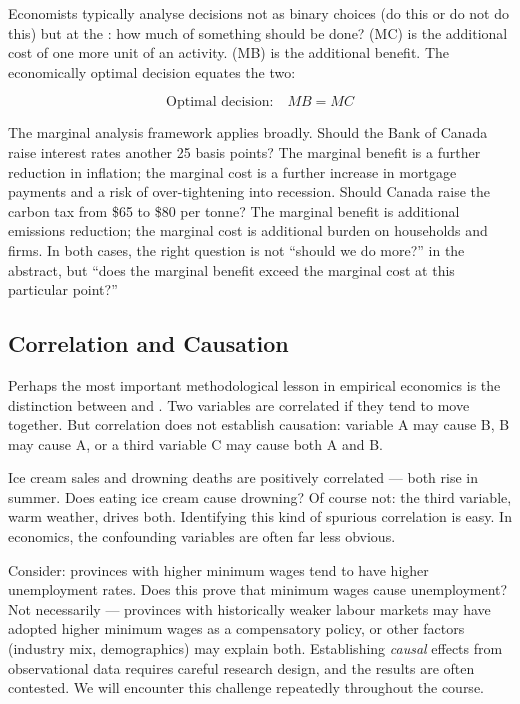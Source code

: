 Economists typically analyse decisions not as binary choices (do this or do
not do this) but at the : how much of something should be done?
 (MC) is the additional cost of one more unit of
an activity.  (MB) is the additional benefit.
The economically optimal decision equates the two:

\begin{equation}
  \text{Optimal decision:} \quad MB = MC
  \label{eq:mb_mc}
\end{equation}

The marginal analysis framework applies broadly. Should the Bank of Canada
raise interest rates another 25 basis points? The marginal benefit is a
further reduction in inflation; the marginal cost is a further increase
in mortgage payments and a risk of over-tightening into recession. Should
Canada raise the carbon tax from \$65 to \$80 per tonne? The marginal
benefit is additional emissions reduction; the marginal cost is additional
burden on households and firms. In both cases, the right question is not
``should we do more?'' in the abstract, but ``does the marginal benefit
exceed the marginal cost at this particular point?''

\subsection{Correlation and Causation}

Perhaps the most important methodological lesson in empirical economics is
the distinction between  and . Two
variables are correlated if they tend to move together. But correlation
does not establish causation: variable A may cause B, B may cause A, or
a third variable C may cause both A and B.

\begin{thinkbox}
Ice cream sales and drowning deaths are positively correlated --- both rise
in summer. Does eating ice cream cause drowning? Of course not: the third
variable, warm weather, drives both. Identifying this kind of spurious
correlation is easy. In economics, the confounding variables are often
far less obvious.

Consider: provinces with higher minimum wages tend to have higher
unemployment rates. Does this prove that minimum wages cause unemployment?
Not necessarily --- provinces with historically weaker labour markets may
have adopted higher minimum wages as a compensatory policy, or other
factors (industry mix, demographics) may explain both. Establishing
\textit{causal} effects from observational data requires careful
research design, and the results are often contested. We will encounter
this challenge repeatedly throughout the course.
\end{thinkbox}

